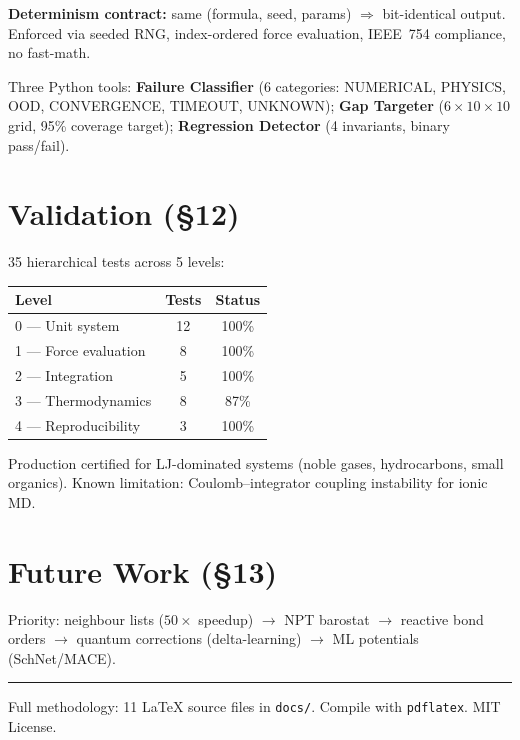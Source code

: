 \documentclass[10pt, a4paper, twocolumn]{article}
\begin{document}
\textbf{Determinism contract:} same (formula, seed, params) $\Rightarrow$
bit-identical output.  Enforced via seeded RNG, index-ordered force
evaluation, IEEE~754 compliance, no fast-math.

Three Python tools:
\textbf{Failure Classifier} (6 categories: NUMERICAL, PHYSICS, OOD,
CONVERGENCE, TIMEOUT, UNKNOWN);
\textbf{Gap Targeter} ($6{\times}10{\times}10$ grid, 95\% coverage
target);
\textbf{Regression Detector} (4 invariants, binary pass/fail).

\section{Validation (\S12)}

35 hierarchical tests across 5 levels:

\begin{center}\small
\begin{tabular}{@{}lcc@{}}
\toprule
Level & Tests & Status \\
\midrule
0 --- Unit system & 12 & 100\% \\
1 --- Force evaluation & 8 & 100\% \\
2 --- Integration & 5 & 100\% \\
3 --- Thermodynamics & 8 & 87\% \\
4 --- Reproducibility & 3 & 100\% \\
\bottomrule
\end{tabular}
\end{center}

Production certified for LJ-dominated systems (noble gases,
hydrocarbons, small organics).
Known limitation: Coulomb--integrator coupling instability for
ionic MD.

\section{Future Work (\S13)}

Priority: neighbour lists ($50\times$ speedup) $\to$ NPT barostat
$\to$ reactive bond orders $\to$ quantum corrections (delta-learning)
$\to$ ML potentials (SchNet/MACE).

\vspace{0.5em}\hrule\vspace{0.3em}
{\footnotesize Full methodology: 11 LaTeX source files in
\texttt{docs/}.  Compile with \texttt{pdflatex}.  MIT License.}
\end{document}

